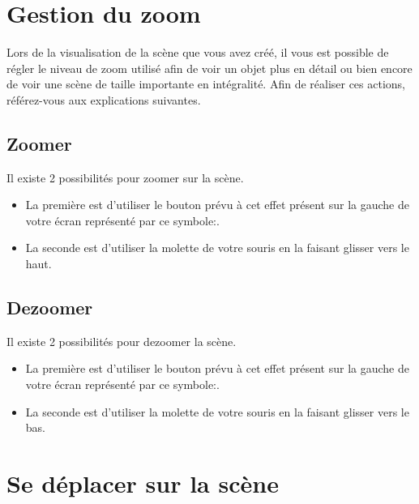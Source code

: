 \documentclass[11pt]{report}
\begin{document}
\section{Gestion du zoom}

Lors de la visualisation de la scène que vous avez créé, il vous est possible de régler le niveau de zoom utilisé afin de voir un objet plus en détail ou bien encore de voir une scène de taille importante en intégralité. Afin de réaliser ces actions, référez-vous aux explications suivantes.


\subsection{Zoomer}

\hypertarget{zoom}{Il existe 2 possibilités pour zoomer sur la scène.}
\begin{itemize}
        \item La première est d'utiliser le bouton prévu à cet effet présent sur la gauche de votre écran représenté par ce symbole:.
        \item La seconde est d'utiliser la molette de votre souris en la faisant glisser vers le haut.
\end{itemize}

\subsection{Dezoomer}

\hypertarget{dezoom}{Il existe 2 possibilités pour dezoomer la scène.}

\begin{itemize}
        \item La première est d'utiliser le bouton prévu à cet effet présent sur la gauche de votre écran représenté par ce symbole:.
        \item La seconde est d'utiliser la molette de votre souris en la faisant glisser vers le bas.
\end{itemize}



\section{Se déplacer sur la scène}
\end{document}
